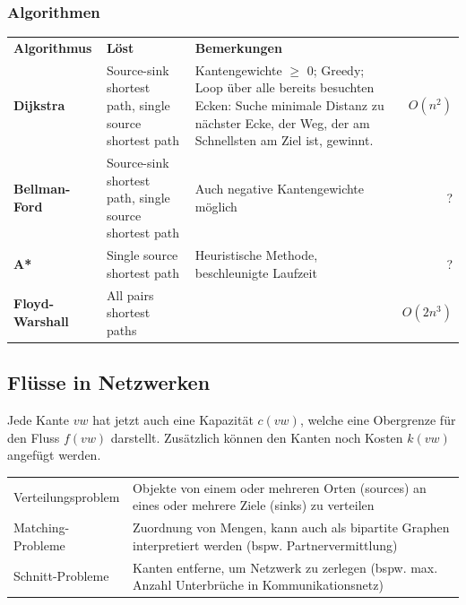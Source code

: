   \subsubsection{Algorithmen}
    \begin{tabularx}{\textwidth}{p{3cm} p{4cm} X r}
      \textbf{Algorithmus} & \textbf{Löst} & \textbf{Bemerkungen} \\
      \textbf{Dijkstra} 
        & Source-sink shortest path, single source shortest path
        & Kantengewichte $\geq$ 0; Greedy; Loop über alle bereits besuchten Ecken: Suche minimale Distanz zu nächster Ecke, der Weg, der am Schnellsten am Ziel ist, gewinnt.
        & $O(n^2)$\\
      \textbf{Bellman-Ford}
        & Source-sink shortest path, single source shortest path
        & Auch negative Kantengewichte möglich 
        & ?\\
      \textbf{A*} 
        & Single source shortest path
        & Heuristische Methode, beschleunigte Laufzeit
        & ?\\
      \textbf{Floyd-Warshall }
        & All pairs shortest paths 
        &
        & $O(2n^3)$\\
    \end{tabularx}
	
\subsection{Flüsse in Netzwerken }
  Jede Kante $vw$ hat jetzt auch eine Kapazität $c(vw)$, welche eine Obergrenze für den Fluss $f(vw)$ darstellt. Zusätzlich können den Kanten noch Kosten $k(vw)$ angefügt werden.
  
  \begin{tabularx}{\textwidth}{l X}
    Verteilungsproblem
      & Objekte von einem oder mehreren Orten (sources) an eines oder mehrere Ziele (sinks) zu verteilen\\
    Matching-Probleme
      & Zuordnung von Mengen, kann auch als bipartite Graphen interpretiert werden (bspw. Partnervermittlung) \\
    Schnitt-Probleme
      & Kanten entferne, um Netzwerk zu zerlegen (bspw. max. Anzahl Unterbrüche in Kommunikationsnetz)\\
  \end{tabularx}
  
